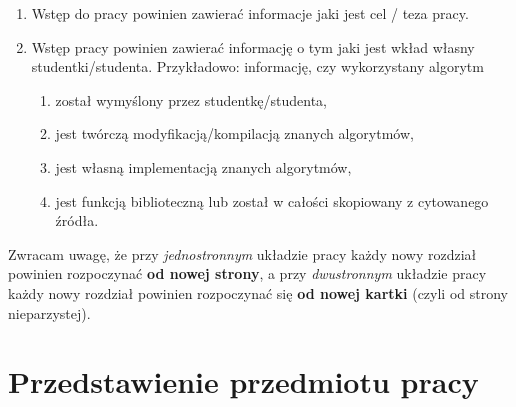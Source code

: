 \documentclass[12pt]{book}
\begin{document}
\begin{enumerate}
 \addtocounter{enumi}{8} %
	\item 

Wstęp do pracy powinien zawierać informacje jaki jest cel / teza pracy.

	\item 

Wstęp pracy powinien zawierać informację o tym jaki jest wkład własny studentki/studenta.
Przykładowo: informację, czy wykorzystany algorytm
\begin{enumerate}
	\item 
 został wymyślony przez studentkę/studenta,
	\item 
 jest twórczą modyfikacją/kompilacją znanych algorytmów,
	\item 
 jest własną implementacją znanych algorytmów,
	\item 
 jest funkcją biblioteczną lub został w całości skopiowany z cytowanego źródła.
\end{enumerate}
\end{enumerate}

Zwracam uwagę, że 
przy \emph{jednostronnym} układzie pracy 
każdy nowy rozdział powinien rozpoczynać
\textbf{od nowej strony}, 
a przy \textit{dwustronnym} układzie pracy 
każdy nowy rozdział powinien rozpoczynać
się \textbf{od nowej kartki} (czyli od strony nieparzystej).



\chapter{Przedstawienie przedmiotu pracy}
\end{document}
